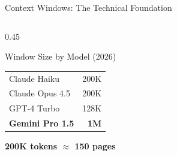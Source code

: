 \documentclass[aspectratio=169, 11pt]{beamer}
\begin{document}
\begin{frame}{Context Windows: The Technical Foundation}
\begin{columns}[T]
\begin{column}{0.45\textwidth}
            \vspace{0.3cm}
            \begin{block}{Window Size by Model (2026)}
                \footnotesize
                \begin{tabular}{lr}
                    Claude Haiku & 200K \\
                    Claude Opus 4.5 & 200K \\
                    GPT-4 Turbo & 128K \\
                    \textbf{Gemini Pro 1.5} & \textbf{1M} \\
                \end{tabular}
            \end{block}

            \vspace{0.2cm}
            \textcolor{UofSCGarnet}{\textbf{200K tokens $\approx$ 150 pages}}
        \end{column}
    \end{columns}

\end{frame}
\end{document}
